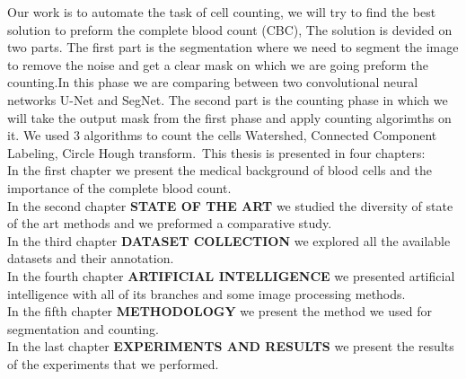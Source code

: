 Our work is to automate the task of cell counting, we will  try to find the best solution to preform the complete blood count (CBC), The solution is devided on two parts.
The first part is the segmentation where we need to segment the image to remove the noise and get a clear mask on which we are going preform the counting.In this phase we are comparing between two convolutional neural networks U-Net and SegNet.
The second part is the counting phase in which we will take  the output mask from the first phase and apply counting algorimths on it. We used 3 algorithms to count the cells Watershed, Connected Component Labeling, Circle Hough transform.\
This thesis is presented in four chapters:\\
In the first chapter we present the medical background of blood cells and the importance of the complete blood count.\\
In the second chapter \textbf{STATE OF THE ART} we studied the diversity of state of the art methods and we preformed a comparative study.\\
In the third chapter \textbf{DATASET COLLECTION} we explored all the available datasets and their annotation.\\
In the fourth chapter \textbf{ARTIFICIAL INTELLIGENCE} we presented artificial intelligence with all of its branches and some image processing methods.\\
In the fifth chapter \textbf{METHODOLOGY} we present the method we used for segmentation and counting.\\
In the last chapter \textbf{EXPERIMENTS AND RESULTS} we present the results of the experiments that we performed.


